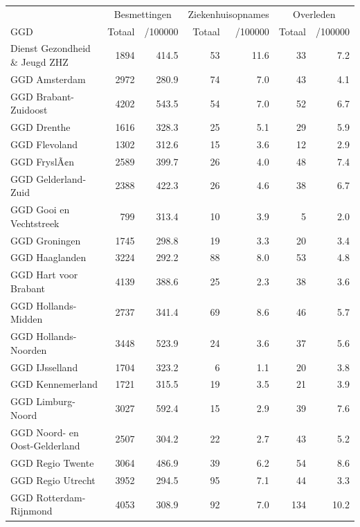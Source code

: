 \documentclass[
  english,
  man,floatsintext]{apa6}
\begin{document}
\begin{table}[H]
\centering\begingroup\fontsize{10}{12}\selectfont

\begin{threeparttable}
\begin{tabular}{lrrrrrr}
\toprule
\multicolumn{1}{c}{ } & \multicolumn{2}{c}{Besmettingen} & \multicolumn{2}{c}{Ziekenhuisopnames} & \multicolumn{2}{c}{Overleden} \\
\cmidrule(l{3pt}r{3pt}){2-3} \cmidrule(l{3pt}r{3pt}){4-5} \cmidrule(l{3pt}r{3pt}){6-7}
GGD & Totaal & /100000 & Totaal & /100000 & Totaal & /100000\\
\midrule
Dienst Gezondheid \& Jeugd ZHZ & 1894 & 414.5 & 53 & 11.6 & 33 & 7.2\\
GGD Amsterdam & 2972 & 280.9 & 74 & 7.0 & 43 & 4.1\\
GGD Brabant-Zuidoost & 4202 & 543.5 & 54 & 7.0 & 52 & 6.7\\
GGD Drenthe & 1616 & 328.3 & 25 & 5.1 & 29 & 5.9\\
GGD Flevoland & 1302 & 312.6 & 15 & 3.6 & 12 & 2.9\\
GGD FryslÃ¢n & 2589 & 399.7 & 26 & 4.0 & 48 & 7.4\\
GGD Gelderland-Zuid & 2388 & 422.3 & 26 & 4.6 & 38 & 6.7\\
GGD Gooi en Vechtstreek & 799 & 313.4 & 10 & 3.9 & 5 & 2.0\\
GGD Groningen & 1745 & 298.8 & 19 & 3.3 & 20 & 3.4\\
GGD Haaglanden & 3224 & 292.2 & 88 & 8.0 & 53 & 4.8\\
GGD Hart voor Brabant & 4139 & 388.6 & 25 & 2.3 & 38 & 3.6\\
GGD Hollands-Midden & 2737 & 341.4 & 69 & 8.6 & 46 & 5.7\\
GGD Hollands-Noorden & 3448 & 523.9 & 24 & 3.6 & 37 & 5.6\\
GGD IJsselland & 1704 & 323.2 & 6 & 1.1 & 20 & 3.8\\
GGD Kennemerland & 1721 & 315.5 & 19 & 3.5 & 21 & 3.9\\
GGD Limburg-Noord & 3027 & 592.4 & 15 & 2.9 & 39 & 7.6\\
GGD Noord- en Oost-Gelderland & 2507 & 304.2 & 22 & 2.7 & 43 & 5.2\\
GGD Regio Twente & 3064 & 486.9 & 39 & 6.2 & 54 & 8.6\\
GGD Regio Utrecht & 3952 & 294.5 & 95 & 7.1 & 44 & 3.3\\
GGD Rotterdam-Rijnmond & 4053 & 308.9 & 92 & 7.0 & 134 & 10.2\\

\end{tabular}
\end{threeparttable}
\end{table}
\end{document}

